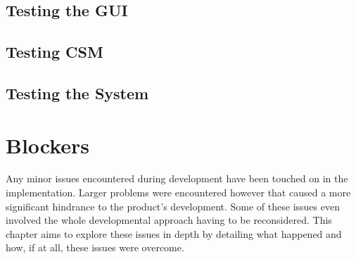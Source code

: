 		\section{Testing the GUI}
			
		\section{Testing CSM}
			
		\section{Testing the System}
				
	\chapter{Blockers}
	Any minor issues encountered during development have been touched on in the implementation. Larger problems were encountered however that caused a more significant hindrance to the product's development. Some of these issues even involved the whole developmental approach having to be reconsidered. This chapter aims to explore these issues in depth by detailing what happened and how, if at all, these issues were overcome.
		
